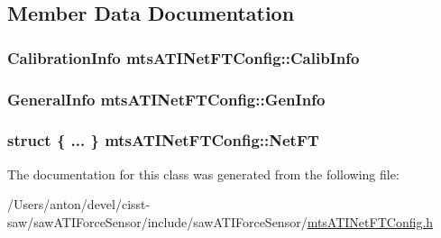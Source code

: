 \subsection{Member Data Documentation}
\hypertarget{classmts_a_t_i_net_f_t_config_a8a79d092fb24d610b055aca16680e749}{}
\subsubsection[{Calib\+Info}]{\setlength{\rightskip}{0pt plus 5cm}Calibration\+Info mts\+A\+T\+I\+Net\+F\+T\+Config\+::\+Calib\+Info}\label{classmts_a_t_i_net_f_t_config_a8a79d092fb24d610b055aca16680e749}
\hypertarget{classmts_a_t_i_net_f_t_config_a683259eee30c2156fe2e46bb34caa4eb}{}
\subsubsection[{Gen\+Info}]{\setlength{\rightskip}{0pt plus 5cm}General\+Info mts\+A\+T\+I\+Net\+F\+T\+Config\+::\+Gen\+Info}\label{classmts_a_t_i_net_f_t_config_a683259eee30c2156fe2e46bb34caa4eb}
\hypertarget{classmts_a_t_i_net_f_t_config_a4c66b740b9f14f25d9b0829dfd31b3c4}{}
\subsubsection[{Net\+F\+T}]{\setlength{\rightskip}{0pt plus 5cm}struct \{ ... \}   mts\+A\+T\+I\+Net\+F\+T\+Config\+::\+Net\+F\+T}\label{classmts_a_t_i_net_f_t_config_a4c66b740b9f14f25d9b0829dfd31b3c4}


The documentation for this class was generated from the following file\+:\begin{DoxyCompactItemize}
\item 
/\+Users/anton/devel/cisst-\/saw/saw\+A\+T\+I\+Force\+Sensor/include/saw\+A\+T\+I\+Force\+Sensor/\hyperlink{mts_a_t_i_net_f_t_config_8h}{mts\+A\+T\+I\+Net\+F\+T\+Config.\+h}\end{DoxyCompactItemize}
